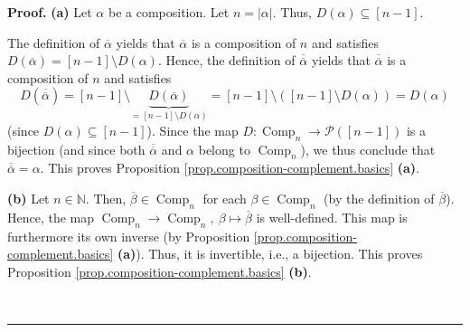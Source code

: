 \documentclass[numbers=enddot,12pt,final,onecolumn,notitlepage]{scrartcl}%
\theoremstyle{definition}
\newenvironment{proof}[1][Proof]{\noindent\textbf{#1.} }{\ \rule{0.5em}{0.5em}}
\begin{document}
\begin{proof}
\textbf{(a)} Let $\alpha$ be a composition. Let $n=\left\vert \alpha
\right\vert $. Thus, $D\left(  \alpha\right)  \subseteq\left[  n-1\right]  $.

The definition of $\overline{\alpha}$ yields that $\overline{\alpha}$ is a
composition of $n$ and satisfies $D\left(  \overline{\alpha}\right)  =\left[
n-1\right]  \setminus D\left(  \alpha\right)  $. Hence, the definition of
$\overline{\overline{\alpha}}$ yields that $\overline{\overline{\alpha}}$ is a
composition of $n$ and satisfies%
\[
D\left(  \overline{\overline{\alpha}}\right)  =\left[  n-1\right]
\setminus\underbrace{D\left(  \overline{\alpha}\right)  }_{=\left[
n-1\right]  \setminus D\left(  \alpha\right)  }=\left[  n-1\right]
\setminus\left(  \left[  n-1\right]  \setminus D\left(  \alpha\right)
\right)  =D\left(  \alpha\right)
\]
(since $D\left(  \alpha\right)  \subseteq\left[  n-1\right]  $). Since the map
$D:\operatorname*{Comp}\nolimits_{n}\rightarrow\mathcal{P}\left(  \left[
n-1\right]  \right)  $ is a bijection (and since both $\overline
{\overline{\alpha}}$ and $\alpha$ belong to $\operatorname*{Comp}%
\nolimits_{n}$), we thus conclude that $\overline{\overline{\alpha}}=\alpha$.
This proves Proposition \ref{prop.composition-complement.basics} \textbf{(a)}.
\medskip

\textbf{(b)} Let $n\in\mathbb{N}$. Then, $\overline{\beta}\in
\operatorname*{Comp}\nolimits_{n}$ for each $\beta\in\operatorname*{Comp}%
\nolimits_{n}$ (by the definition of $\overline{\beta}$). Hence, the map
$\operatorname*{Comp}\nolimits_{n}\rightarrow\operatorname*{Comp}%
\nolimits_{n},\ \beta\mapsto\overline{\beta}$ is well-defined. This map is
furthermore its own inverse (by Proposition
\ref{prop.composition-complement.basics} \textbf{(a)}). Thus, it is
invertible, i.e., a bijection. This proves Proposition
\ref{prop.composition-complement.basics} \textbf{(b)}. \medskip


\end{proof}
\end{document}
